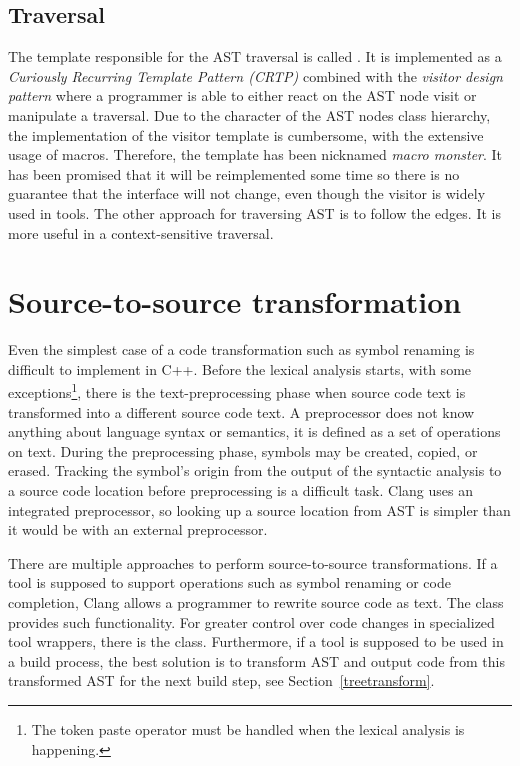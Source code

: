 \subsection{Traversal}
\label{clang-ast-traversal}
The template responsible for the AST traversal is called . It is implemented as a \emph{Curiously Recurring Template Pattern (CRTP)} combined with the \emph{visitor design pattern} where a programmer is able to either react on the AST node visit or manipulate a traversal. Due to the character of the AST nodes class hierarchy, the implementation of the visitor template is cumbersome, with the extensive usage of macros. Therefore, the template has been nicknamed \textit{macro monster}. It has been promised that it will be reimplemented some time so there is no guarantee that the interface will not change, even though the visitor is widely used in tools. The other approach for traversing AST is to follow the edges. It is more useful in a context-sensitive traversal.

\section{Source-to-source transformation}
Even the simplest case of a code transformation such as symbol renaming is difficult to implement in C++. Before the lexical analysis starts, with some exceptions\footnote{The token paste operator \code{\#\#} must be handled when the lexical analysis is happening.}, there is the text-preprocessing phase when source code text is transformed into a different source code text. A preprocessor does not know anything about language syntax or semantics, it is defined as a set of operations on text. During the preprocessing phase, symbols may be created, copied, or erased. Tracking the symbol's origin from the output of the syntactic analysis to a source code location before preprocessing is a difficult task. Clang uses an integrated preprocessor, so looking up a source location from AST is simpler than it would be with an external preprocessor.

There are multiple approaches to perform source-to-source transformations. If a tool is supposed to support operations such as symbol renaming or code completion, Clang allows a programmer to rewrite source code as text. The  class provides such functionality. For greater  control over code changes in specialized tool wrappers, there is the  class. Furthermore, if a tool is supposed to be used in a build process, the best solution is to transform AST and output code from this transformed AST for the next build step, see Section~\ref{treetransform}.

